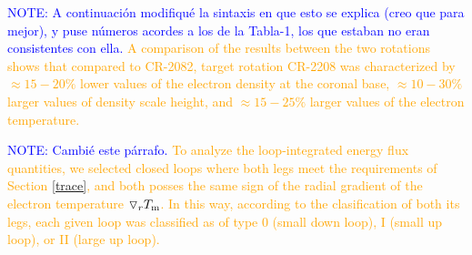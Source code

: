 \documentclass[namedreferences]{solarphysics}
\newcommand{\dr}{\triangledown_r}
\newcommand{\Tm}{T_{\rm m}}
\def\diego#1{\textcolor{red}{#1}}
\def\albert#1{\textcolor{orange}{#1}}
\def\notebyalbert#1{\textcolor{blue}{NOTE: #1}}
\begin{document}
\begin{article}
\notebyalbert{A continuación modifiqué la sintaxis en que esto se explica (creo que para mejor), y puse números acordes a los de la Tabla-1, los que estaban no eran consistentes con ella.} \albert{A comparison of the results between the two rotations shows that compared to CR-2082, target rotation CR-2208 was characterized by $\approx 15-20\%$ lower values of the electron density at the coronal base, $\approx 10-30\%$ larger values of density scale height, and $\approx 15-25\%$ larger values of the electron temperature.}



\notebyalbert{Cambié este párrafo.} \albert{To analyze the loop-integrated energy flux quantities, we selected closed loops where both legs meet the requirements of Section \ref{trace}, and both posses the same sign of the radial gradient of the electron temperature $\dr\Tm$. In this way, according to the clasification of both its legs, each given loop was classified as of type 0 (small down loop), I (small up loop), or II (large up loop).}



\end{article}
\end{document}
